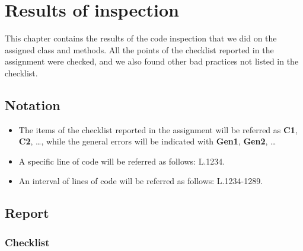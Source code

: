 \chapter{Results of inspection}

This chapter contains the results of the code inspection that we did on the assigned class and methods. All the points of the checklist reported in the assignment were checked, and we also found other bad practices not listed in the checklist.

\section{Notation}
\begin{itemize}
	\item The items of the checklist reported in the assignment will be referred as \textbf{C1}, \textbf{C2}, \ldots, while the general errors will be indicated with \textbf{Gen1}, \textbf{Gen2}, \ldots
	\item A specific line of code will be referred as follows: L.1234.
	\item An interval of lines of code will be referred as follows: L.1234-1289.
\end{itemize}

\section{Report}

\subsection{Checklist}

